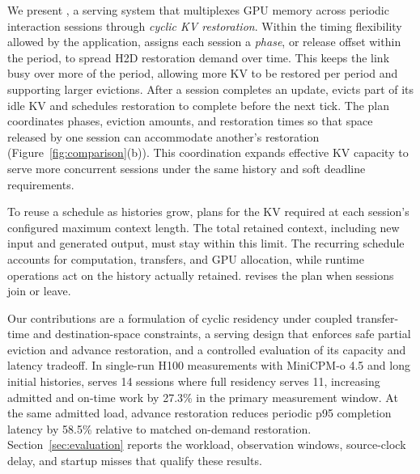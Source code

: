 We present \systemname, a serving system that multiplexes GPU memory across periodic interaction sessions through \emph{cyclic KV restoration}.
Within the timing flexibility allowed by the application, \systemname assigns each session a \emph{phase}, or release offset within the period, to spread H2D restoration demand over time.
This keeps the link busy over more of the period, allowing more KV to be restored per period and supporting larger evictions.
After a session completes an update, \systemname evicts part of its idle KV and schedules restoration to complete before the next tick.
The plan coordinates phases, eviction amounts, and restoration times so that space released by one session can accommodate another's restoration (Figure~\ref{fig:comparison}(b)).
This coordination expands effective KV capacity to serve more concurrent sessions under the same history and soft deadline requirements.

To reuse a schedule as histories grow, \systemname plans for the KV required at each session's configured maximum context length.
The total retained context, including new input and generated output, must stay within this limit.
The recurring schedule accounts for computation, transfers, and GPU allocation, while runtime operations act on the history actually retained.
\systemname revises the plan when sessions join or leave.

Our contributions are a formulation of cyclic residency under coupled transfer-time and destination-space constraints, a serving design that enforces safe partial eviction and advance restoration, and a controlled evaluation of its capacity and latency tradeoff.
In single-run H100 measurements with MiniCPM-o 4.5 and long initial histories, \systemname serves 14 sessions where full residency serves 11, increasing admitted and on-time work by 27.3\% in the primary measurement window.
At the same admitted load, advance restoration reduces periodic p95 completion latency by 58.5\% relative to matched on-demand restoration.
Section~\ref{sec:evaluation} reports the workload, observation windows, source-clock delay, and startup misses that qualify these results.
